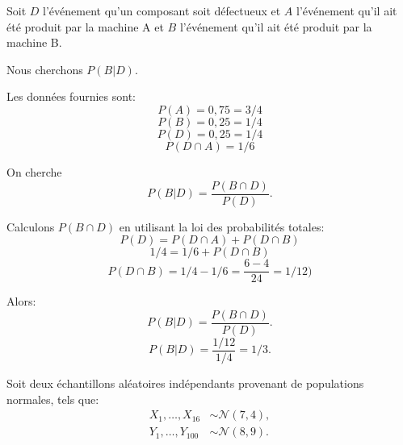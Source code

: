 \begin{questions}
\begin{solution}
Soit \( D \) l'événement qu'un composant soit défectueux et \( A \) l'événement qu'il ait été produit par la machine A et \( B \) l'événement qu'il ait été produit par la machine B.

Nous cherchons \( P(B|D) \).

Les données fournies sont:
\[ P(A) = 0,75 = 3/4\]
\[ P(B) = 0,25 =1/4\]
\[ P(D) = 0,25 = 1/4 \]
\[ P(D \cap A) = 1/6 \]


On cherche
\[ P(B|D) = \frac{P(B \cap D)}{P(D)} .\]

Calculons \(P(B \cap D)\) en utilisant la loi des probabilités totales:
\[ P(D) = P(D\cap A)  + P(D \cap B) \]
\[ 1/4 = 1/6 + P(D \cap B) \]
\[ P(D \cap B) = 1/4 - 1/6 = \frac{6-4}{24} = 1/12) \]

Alors:
\[ P(B|D) = \frac{P(B \cap D)}{P(D)} .\]
\[ P(B|D) = \frac{1/12}{1/4} = 1/3 .\]
\end{solution}



\vspace{0.5cm}

\newpage

\question Soit deux échantillons aléatoires indépendants provenant de populations normales, tels que:
\begin{align*}
    X_1,\hdots,X_{16}&\sim\mathcal{N}(7, 4),\\
    Y_1,\hdots,Y_{100}&\sim\mathcal{N}(8, 9).
\end{align*}

\end{questions}
